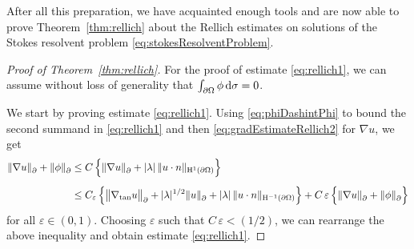 After all this preparation, we have acquainted enough tools and are now able to prove Theorem~\ref{thm:rellich} about the Rellich estimates on solutions of the Stokes resolvent problem \eqref{eq:stokesResolventProblem}.

\begin{proof}[Proof of Theorem~\ref{thm:rellich}]
  For the proof of estimate \eqref{eq:rellich1}, we can assume without loss of generality that $\int_{\partial\Omega} \phi \, {\operatorname{d}\!{\sigma}} = 0$.

  We start by proving estimate \eqref{eq:rellich1}. 
  Using \eqref{eq:phiDashintPhi} to bound the second summand in \eqref{eq:rellich1} and then \eqref{eq:gradEstimateRellich2} for $\nabla u$, we get
  \begin{align*}
      \|\nabla u\|^{}_\partial + \|\phi\|^{}_\partial
      &\leq C\, \Big\{ \|\nabla u\|^{}_\partial + |\lambda|\, \|u \cdot n \|_{\mathrm{H}^1(\partial\Omega)} \Big\} \\[0.5em]
      &\leq C_\varepsilon\, \Big\{ \big\|\nabla_{\mathrm{tan}} u \big\|^{}_\partial + |\lambda|^{1/2} \|u\|^{}_\partial + |\lambda|\, \| u\cdot n\|_{\mathrm{H}^{-1}(\partial\Omega)} \Big\} 
      + C \,\varepsilon \,\Big\{ \|\nabla u\|^{}_\partial + \|\phi\|^{}_\partial \Big\}
  \end{align*}
  for all $\varepsilon \in (0,1)$.
  Choosing $\varepsilon$ such that $C\, \varepsilon < (1/2)$, we can rearrange the above inequality and obtain estimate \eqref{eq:rellich1}.


\end{proof}

